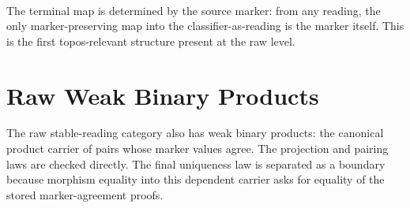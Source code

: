 \documentclass[11pt]{article}
\begin{document}
\begin{code}
\>[6]\AgdaSymbol{\{}\AgdaSpace{}%
%
\>[27]\AgdaSymbol{=}\AgdaSpace{}%
\AgdaSpace{}%
\<%
\\
%
\>[6]\AgdaSymbol{;}\AgdaSpace{}%
\AgdaSpace{}%
\AgdaSymbol{=}\AgdaSpace{}%
\AgdaSpace{}%
\AgdaSpace{}%
\AgdaSpace{}%
\<%
\\
%
\>[6]\AgdaSymbol{\}}\<%
\\
%
\>[2]\AgdaSymbol{;}%
\>[1491I]\AgdaSpace{}%
\AgdaSymbol{=}\AgdaSpace{}%
\AgdaSpace{}%
\AgdaSpace{}%
\AgdaSpace{}%
\<%
\\
\>[1491I][@{}l@{\AgdaIndent{0}}]%
\>[6]\AgdaSymbol{\{}\AgdaSpace{}%
\AgdaSpace{}%
\AgdaSymbol{=}\AgdaSpace{}%
\AgdaSpace{}%
\AgdaSpace{}%
\AgdaSpace{}%
\AgdaSpace{}%
\AgdaSpace{}%
\<%
\\
%
\>[6]\AgdaSymbol{\}}\<%
\\
%
\>[2]\AgdaSymbol{\}}\<%
\end{code}

The terminal map is determined by the source marker: from any reading,
the only marker-preserving map into the classifier-as-reading is the
marker itself.  This is the first topos-relevant structure present at the
raw level.

\section{Raw Weak Binary Products}

The raw stable-reading category also has weak binary products: the
canonical product carrier of pairs whose marker values
agree.  The projection and pairing laws are checked directly.  The final
uniqueness law is separated as a boundary because morphism equality into
this dependent carrier asks for equality of the stored marker-agreement
proofs.
\end{document}
